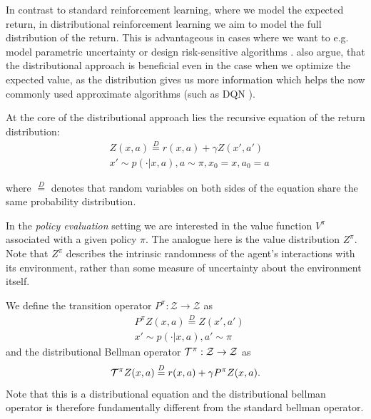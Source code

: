 In contrast to standard reinforcement learning, where we model the expected return, in distributional reinforcement learning we aim to model the full distribution of the return. This is advantageous in cases where we want to e.g. model parametric uncertainty or design risk-sensitive algorithms \citep{morimura2010nonparametric, morimura2012parametric}. \citet{bellemare2017distributional} also argue, that the distributional approach is beneficial even in the case when we optimize the expected value, as the distribution gives us more information which helps the now commonly used approximate algorithms (such as DQN \citep{mnih2015human}).

At the core of the distributional approach lies the recursive equation of the return distribution:
\begin{equation}
\begin{split}
&Z(x, a) \overset{D}{=} r(x, a) + \gamma Z(x', a')\\
&x' \sim p(\cdot|x, a), a \sim \pi, x_0 = x, a_0 = a
\end{split}
\end{equation}

where $\overset{D}{=}$ denotes that random variables on both sides of the equation share the same probability distribution.

In the \emph{policy evaluation} setting \citep{sutton1998reinforcement} we are interested in the value function $V^\pi$ associated with a given policy $\pi$. The analogue here is the value distribution $Z^\pi$. Note that $Z^\pi$ describes the intrinsic randomness of the agent's interactions with its environment, rather than some measure of uncertainty about the environment itself.
%

We define the transition operator $P^\pi : \mathcal{Z} \to \mathcal{Z}$ as
\begin{equation}\label{eqn:transitionop}
\begin{split}
&P^\pi Z(x, a) \overset{D}{=} Z(x', a')\\
&x' \sim p(\cdot|x, a), a' \sim \pi
\end{split}
\end{equation}
and the distributional Bellman operator $\mathcal{T}^\pi : \mathcal{Z} \to \mathcal{Z}$ as
\begin{equation}
\mathcal{T}^\pi Z(x,a) \overset{D}{=} r(x,a) + \gamma P^\pi Z(x,a).
\end{equation}
Note that this is a distributional equation and the distributional bellman operator is therefore fundamentally different from the standard bellman operator.

